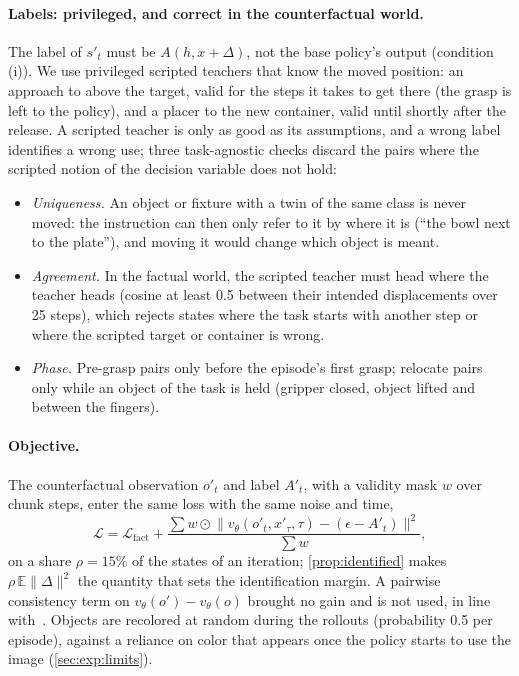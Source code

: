 \paragraph{Labels: privileged, and correct in the counterfactual world.}
The label of $s'_t$ must be $A(h,x+\Delta)$, not the base policy's output (condition (i)).
We use privileged scripted teachers that know the moved position: an approach to above the target, valid for the steps it
takes to get there (the grasp is left to the policy), and a placer to the new container, valid until shortly after the
release.
A scripted teacher is only as good as its assumptions, and a wrong label identifies a wrong use; three task-agnostic checks
discard the pairs where the scripted notion of the decision variable does not hold:
\begin{itemize}
\item \emph{Uniqueness.} An object or fixture with a twin of the same class is never moved: the instruction can then only
refer to it by where it is (``the bowl next to the plate''), and moving it would change which object is meant.
\item \emph{Agreement.} In the factual world, the scripted teacher must head where the \pizf teacher heads (cosine at least
0.5 between their intended displacements over 25 steps), which rejects states where the task starts with another step or
where the scripted target or container is wrong.
\item \emph{Phase.} Pre-grasp pairs only before the episode's first grasp; relocate pairs only while an object of the task is
held (gripper closed, object lifted and between the fingers).
\end{itemize}

\paragraph{Objective.}
The counterfactual observation $o'_t$ and label $A'_t$, with a validity mask $w$ over chunk steps, enter the same loss with
the same noise and time,
\begin{equation}
\mathcal{L} = \mathcal{L}_{\text{fact}} + \frac{\sum w \odot \lVert v_\theta(o'_t, x'_\tau, \tau) - (\epsilon - A'_t) \rVert^2}{\sum w},
\end{equation}
on a share $\rho=15\%$ of the states of an iteration; \cref{prop:identified} makes $\rho\,\mathbb{E}\lVert\Delta\rVert^2$
the quantity that sets the identification margin. A pairwise consistency term on $v_\theta(o')-v_\theta(o)$ brought no gain
and is not used, in line with~\cite{chen2026ect}.
Objects are recolored at random during the rollouts (probability 0.5 per episode), against a reliance on color that appears
once the policy starts to use the image (\cref{sec:exp:limits}).

